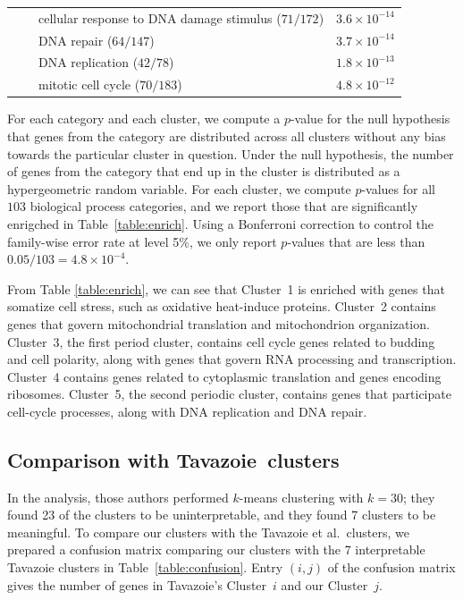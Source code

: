 \documentclass[12pt]{article}
\begin{document}
\begin{table}
\begin{center}
\begin{tabular}{ccll}
    &       & cellular response to DNA damage stimulus ($71/172$)      & $3.6\times10^{-14}$ \\
    &       & DNA repair ($64/147$)                   & $3.7\times10^{-14}$ \\
    &       & DNA replication ($42/78$)               & $1.8\times10^{-13}$ \\
    &       & mitotic cell cycle ($70/183$)           & $4.8\times10^{-12}$ \\
\bottomrule
\end{tabular}
\end{center}
\hspace{0.5in} \footnotesize {}
\end{table} 


For each category and each cluster, we compute a $p$-value for the null
hypothesis that genes from the category are distributed across all clusters
without any bias towards the particular cluster in question. Under the null
hypothesis, the number of genes from the category that end up in the cluster
is distributed as a hypergeometric random variable. For each cluster, we
compute $p$-values for all $103$ biological process categories, and we report
those that are significantly enrigched in Table~\ref{table:enrich}.  Using a
Bonferroni correction to control the family-wise error rate at level 5\%, we
only report $p$-values that are less than $0.05 / 103 = 4.8\times10^{-4}$.




From Table \ref{table:enrich}, we can see that Cluster~1 is enriched with
genes that somatize cell stress, such as oxidative heat-induce proteins.
Cluster~2 contains genes that govern mitochondrial translation and
mitochondrion organization. Cluster~3, the first period cluster, contains cell
cycle genes related to budding and cell polarity, along with genes that govern
RNA processing and transcription. Cluster~4 contains genes related to
cytoplasmic translation and genes encoding ribosomes. Cluster~5, the second
periodic cluster, contains genes that participate cell-cycle processes, along
with DNA replication and DNA repair.



\subsection{Comparison with Tavazoie~clusters}

In the \citet{tavazoie1999systematic} analysis, those authors performed
$k$-means clustering with $k = 30$; they found 23 of the clusters to be
uninterpretable, and they found 7 clusters to be meaningful. To compare our
clusters with the Tavazoie et al.\ clusters, we prepared a confusion matrix
comparing our clusters with the 7 interpretable Tavazoie clusters in
Table~\ref{table:confusion}.
Entry $(i,j)$ of the confusion matrix gives the number of genes in
Tavazoie's Cluster~$i$ and our Cluster~$j$. 
\end{document}
